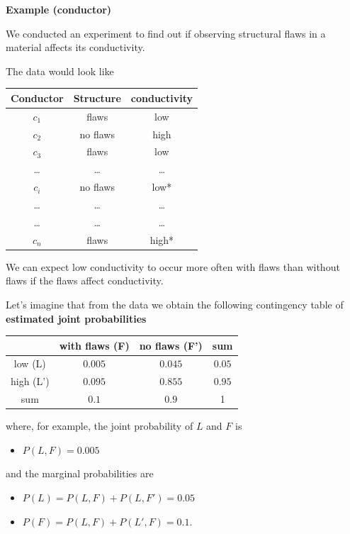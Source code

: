 \documentclass[
]{book}
\providecommand{\tightlist}{%
  \setlength{\itemsep}{0pt}\setlength{\parskip}{0pt}}
\begin{document}
\textbf{Example (conductor)}

We conducted an experiment to find out if observing structural flaws in a material affects its conductivity.

The data would look like

\begin{longtable}[]{@{}ccc@{}}
\toprule\noalign{}
Conductor & Structure & conductivity \\
\midrule\noalign{}
\endhead
\bottomrule\noalign{}
\endlastfoot
\(c_1\) & flaws & low \\
\(c_2\) & no flaws & high \\
\(c_3\) & flaws & low \\
\ldots{} & \ldots{} & \ldots{} \\
\(c_i\) & no flaws & low* \\
\ldots{} & \ldots{} & \ldots{} \\
\ldots{} & \ldots{} & \ldots{} \\
\(c_n\) & flaws & high* \\
\end{longtable}

We can expect low conductivity to occur more often with flaws than without flaws if the flaws affect conductivity.

Let's imagine that from the data we obtain the following contingency table of \textbf{estimated joint probabilities}

\begin{longtable}[]{@{}cccc@{}}
\toprule\noalign{}
& with flaws (F) & no flaws (F') & sum \\
\midrule\noalign{}
\endhead
\bottomrule\noalign{}
\endlastfoot
low (L) & \(0.005\) & \(0.045\) & \(0.05\) \\
high (L') & \(0.095\) & \(0.855\) & \(0.95\) \\
sum & \(0.1\) & \(0.9\) & 1 \\
\end{longtable}

where, for example, the joint probability of \(L\) and \(F\) is

\begin{itemize}
\tightlist
\item
  \(P(L,F )=0.005\)
\end{itemize}

and the marginal probabilities are

\begin{itemize}
\tightlist
\item
  \(P(L)=P(L, F) + P(L, F')=0.05\)
\item
  \(P(F)=P(L, F) + P(L', F)= 0.1\).
\end{itemize}
\end{document}
